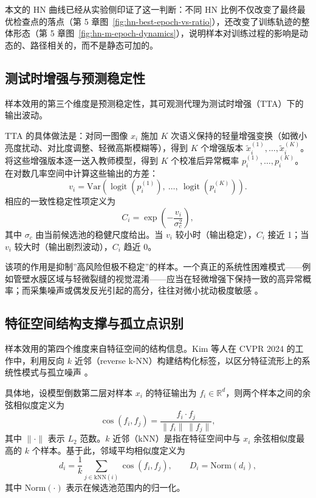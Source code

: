 \documentclass[UTF8,openany,12pt]{ctexbook}
\begin{document}
本文的 HN 曲线已经从实验侧印证了这一判断：不同 HN 比例不仅改变了最终最优检查点的落点（第 5 章图~\ref{fig:hn-best-epoch-vs-ratio}），还改变了训练轨迹的整体形态（第 5 章图~\ref{fig:hn-m-epoch-dynamics}），说明样本对训练过程的影响是动态的、路径相关的，而不是静态可加的。

\subsection{测试时增强与预测稳定性}
样本效用的第三个维度是预测稳定性，其可观测代理为测试时增强（TTA）下的输出波动。

TTA 的具体做法是：对同一图像 $x_i$ 施加 $K$ 次语义保持的轻量增强变换（如微小亮度扰动、对比度调整、轻微高斯模糊等），得到 $K$ 个增强版本 $\tilde{x}_i^{(1)}, \dots, \tilde{x}_i^{(K)}$。将这些增强版本逐一送入教师模型，得到 $K$ 个校准后异常概率 $p_i^{(1)}, \dots, p_i^{(K)}$。在对数几率空间中计算这些输出的方差：
\begin{equation}
v_i = \mathrm{Var}\!\left(\operatorname{logit}(p_i^{(1)}),\ \dots,\ \operatorname{logit}(p_i^{(K)})\right).
\end{equation}
相应的一致性稳定性项定义为
\begin{equation}
C_i = \exp\!\left(-\frac{v_i}{\sigma_c^2}\right),
\end{equation}
其中 $\sigma_c$ 由当前候选池的稳健尺度给出。当 $v_i$ 较小时（输出稳定），$C_i$ 接近 1；当 $v_i$ 较大时（输出剧烈波动），$C_i$ 趋近 0。

该项的作用是抑制”高风险但极不稳定”的样本。一个真正的系统性困难模式——例如管壁水膜区域与轻微裂缝的视觉混淆——应当在轻微增强下保持一致的高异常概率；而采集噪声或偶发反光引起的高分，往往对微小扰动极度敏感 \cite{wu2022entropy}。

\subsection{特征空间结构支撑与孤立点识别}
样本效用的第四个维度来自特征空间的结构信息。Kim 等人在 CVPR 2024 的工作中，利用反向 $k$ 近邻（reverse k-NN）构建结构化标签，以区分特征流形上的系统性模式与孤立噪声 \cite{kim2024structural}。

具体地，设模型倒数第二层对样本 $x_i$ 的特征输出为 $f_i \in \mathbb{R}^d$，则两个样本之间的余弦相似度定义为
\begin{equation}
\cos(f_i, f_j) = \frac{f_i \cdot f_j}{\|f_i\| \, \|f_j\|},
\end{equation}
其中 $\|\cdot\|$ 表示 $L_2$ 范数。$k$ 近邻（kNN）是指在特征空间中与 $x_i$ 余弦相似度最高的 $k$ 个样本。基于此，邻域平均相似度定义为
\begin{equation}
d_i = \frac{1}{k}\sum_{j \in \mathrm{kNN}(i)} \cos(f_i, f_j),
\qquad
D_i = \mathrm{Norm}(d_i),
\end{equation}
其中 $\mathrm{Norm}(\cdot)$ 表示在候选池范围内的归一化。
\end{document}
